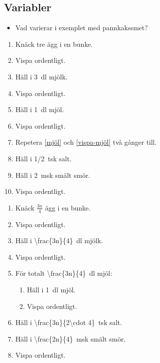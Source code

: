 \subsection{Variabler}

\begin{frame}
  \begin{exercise}
    \begin{itemize}
      \item Vad varierar i exemplet med pannkakssmet?
    \end{itemize}
  \end{exercise}

  \begin{example}
    \begin{enumerate}
      \item Knäck tre ägg i en bunke.
      \item Vispa ordentligt.
      \item Häll i \SI{3}{\deci\litre} mjölk.
      \item Vispa ordentligt.
      \item \label{mjöl} Häll i \SI{1}{\deci\litre} mjöl.
      \item \label{vispa-mjöl} Vispa ordentligt.
      \item Repetera \ref{mjöl} och \ref{vispa-mjöl} två gånger till.
      \item Häll i \SI{1/2}{tsk} salt.
      \item Häll i \SI{2}{msk} smält smör.
      \item Vispa ordentligt.
    \end{enumerate}
  \end{example}
\end{frame}

\begin{frame}
  \begin{example}
    \begin{enumerate}
      \item Knäck \(\frac{3n}{4}\) ägg i en bunke.
      \item Vispa ordentligt.
      \item Häll i \SI{\frac{3n}{4}}{\deci\litre} mjölk.
      \item Vispa ordentligt.
      \item För totalt \SI{\frac{3n}{4}}{\deci\litre} mjöl:
        \begin{enumerate}
          \item Häll i \SI{1}{\deci\litre} mjöl.
          \item Vispa ordentligt.
        \end{enumerate}
      \item Häll i \SI{\frac{3n}{2\cdot 4}}{tsk} salt.
      \item Häll i \SI{\frac{2n}{4}}{msk} smält smör.
      \item Vispa ordentligt.
    \end{enumerate}
  \end{example}
\end{frame}

